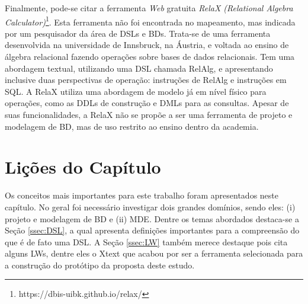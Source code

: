 Finalmente, pode-se citar a ferramenta \textit{Web} gratuita \textit{RelaX (Relational Algebra Calculator)}\footnote{https://dbis-uibk.github.io/relax/}. 
Esta ferramenta não foi encontrada no mapeamento, mas indicada por um pesquisador da área de \acp{DSL} e \acp{BD}. 
Trata-se de uma ferramenta desenvolvida na universidade de Innsbruck, na Áustria, e voltada ao ensino de álgebra relacional fazendo operações sobre bases de dados relacionais. 
Tem uma abordagem textual, utilizando uma \ac{DSL} chamada RelAlg, e apresentando inclusive duas perspectivas de operação: instruções de RelAlg e instruções em \ac{SQL}. 
A RelaX utiliza uma abordagem de modelo já em nível físico para operações, como as \acp{DDL} de construção e \acp{DML} para as consultas. 
Apesar de suas funcionalidades, a RelaX não se propõe a ser uma ferramenta de projeto e modelagem de \ac{BD}, mas de uso restrito ao ensino dentro da academia.

\section{Lições do Capítulo} \label{sec:LicoesFundamentacaoTeorica}

Os conceitos mais importantes para este trabalho foram apresentados neste capítulo. 
No geral foi necessário investigar dois grandes domínios, sendo eles: (i) projeto e modelagem de \ac{BD} e (ii) \ac{MDE}. 
Dentre os temas abordados destaca-se a Seção \ref{ssec:DSL}, a qual apresenta definições importantes para a compreensão do que é de fato uma \ac{DSL}. 
A Seção \ref{ssec:LW} também merece destaque pois cita alguns \acp{LW}, dentre eles o Xtext que acabou por ser a ferramenta selecionada para a construção do protótipo da proposta deste estudo.